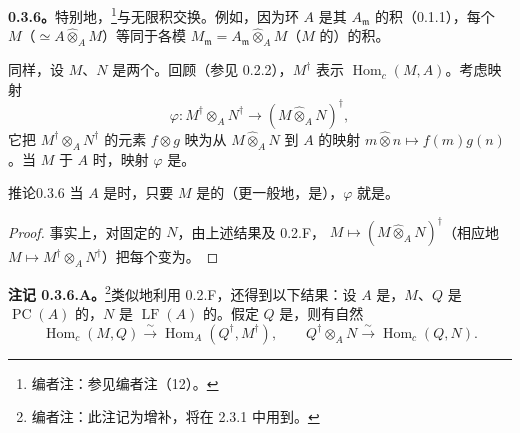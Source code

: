 \textbf{0.3.6。}特别地，\footnote{编者注：参见编者注（12）。}与无限积交换。例如，因为环 $A$ 是其 $A_{\mathfrak m}$ 的积（0.1.1），每个 $M$（$\simeq A\widehat\otimes_A M$）等同于各模 $M_{\mathfrak m}=A_{\mathfrak m}\widehat\otimes_A M$（$M$ 的）的积。

同样，设 $M$、$N$ 是两个。回顾（参见 0.2.2），$M^\dagger$ 表示 $\operatorname{Hom}_c(M,A)$。考虑映射
\[\varphi:M^\dagger\otimes_A N^\dagger\longrightarrow(M\widehat\otimes_A N)^\dagger,\]
它把 $M^\dagger\otimes_A N^\dagger$ 的元素 $f\otimes g$ 映为从 $M\widehat\otimes_A N$ 到 $A$ 的映射 $m\widehat\otimes n\mapsto f(m)g(n)$。当 $M$ 于 $A$ 时，映射 $\varphi$ 是。
\begin{SGAresult}{推论}{0.3.6}
当 $A$ 是时，只要 $M$ 是的（更一般地，是），$\varphi$ 就是。
\end{SGAresult}
\begin{proof}
事实上，对固定的 $N$，由上述结果及 0.2.F， $M\mapsto(M\widehat\otimes_A N)^\dagger$（相应地 $M\mapsto M^\dagger\otimes_A N^\dagger$）把每个变为。
\end{proof}
\textbf{注记 0.3.6.A。}\footnote{编者注：此注记为增补，将在 2.3.1 中用到。}类似地利用 0.2.F，还得到以下结果：设 $A$ 是，$M$、$Q$ 是 $\operatorname{PC}(A)$ 的，$N$ 是 $\operatorname{LF}(A)$ 的。假定 $Q$ 是，则有自然
\[
\operatorname{Hom}_c(M,Q)\xrightarrow{\sim}\operatorname{Hom}_A(Q^\dagger,M^\dagger),
\qquad Q^\dagger\otimes_A N\xrightarrow{\sim}\operatorname{Hom}_c(Q,N).
\]

